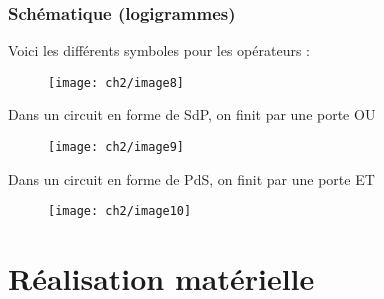 \subsubsection{Schématique (logigrammes)}
Voici les différents symboles pour les opérateurs :
\begin{figure}[H]
	\centering
	\texttt{[image: ch2/image8]}
\end{figure}
Dans un circuit en forme de SdP, on finit par une porte OU
\begin{figure}[H]
	\centering
	\texttt{[image: ch2/image9]}
\end{figure}
Dans un circuit en forme de PdS, on finit par une porte ET
\begin{figure}[H]
	\centering
	\texttt{[image: ch2/image10]}
\end{figure}
\section{Réalisation matérielle}
